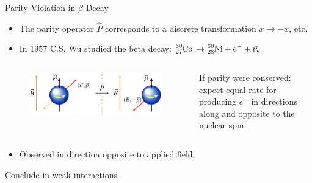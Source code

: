 \documentclass[aspectratio=169]{beamer}
\begin{document}
\begin{frame}{Parity Violation in $\beta$ Decay}
  \begin{itemize}
    \item The parity operator $\hat{P}$ corresponds to a discrete 
      transformation $x \rightarrow -x$, etc.
    \item In 1957 C.S. Wu studied the beta decay:
      $\ce{^{60}_{27}Co \rightarrow ^{60}_{28}Ni + e^{-} + \bar{\nu_{e}}}$
  \end{itemize}
  \begin{columns}
    \begin{column}{0.65\textwidth}
      \begin{figure}
        \centering
        \includegraphics[width=\textwidth]{wu-experiment.png}
      \end{figure}
    \end{column}
    \begin{column}{0.3\textwidth}
      \begin{block}{}
        If parity were conserved: expect equal rate for producing $e^{-}$ in directions
            along and opposite to the nuclear spin.
      \end{block}
    \end{column}
  \end{columns}
  \begin{itemize}
    \item Observed  in direction 
      opposite to applied field.
  \end{itemize}
  \begin{block}{}
    \centering
      Conclude  in weak interactions.
  \end{block}
\end{frame}
\end{document}
